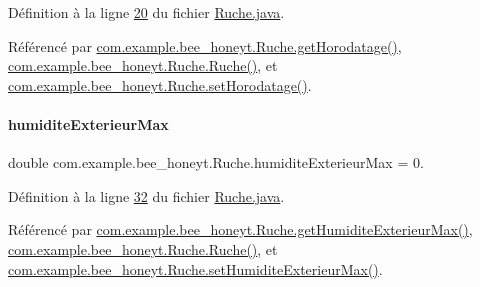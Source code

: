 Définition à la ligne \hyperlink{_ruche_8java_source_l00020}{20} du fichier \hyperlink{_ruche_8java_source}{Ruche.\+java}.



Référencé par \hyperlink{_ruche_8java_source_l00104}{com.\+example.\+bee\+\_\+honeyt.\+Ruche.\+get\+Horodatage()}, \hyperlink{_ruche_8java_source_l00044}{com.\+example.\+bee\+\_\+honeyt.\+Ruche.\+Ruche()}, et \hyperlink{_ruche_8java_source_l00106}{com.\+example.\+bee\+\_\+honeyt.\+Ruche.\+set\+Horodatage()}.

\mbox{\label{classcom_1_1example_1_1bee__honeyt_1_1_ruche_a76e636b4d5e0a18b187905e0d6d73a71}} 
\paragraph{\texorpdfstring{humidite\+Exterieur\+Max}{humiditeExterieurMax}}
{\footnotesize\ttfamily double com.\+example.\+bee\+\_\+honeyt.\+Ruche.\+humidite\+Exterieur\+Max = 0.\hspace{0.3cm}{\ttfamily [private]}}



Définition à la ligne \hyperlink{_ruche_8java_source_l00032}{32} du fichier \hyperlink{_ruche_8java_source}{Ruche.\+java}.



Référencé par \hyperlink{_ruche_8java_source_l00199}{com.\+example.\+bee\+\_\+honeyt.\+Ruche.\+get\+Humidite\+Exterieur\+Max()}, \hyperlink{_ruche_8java_source_l00044}{com.\+example.\+bee\+\_\+honeyt.\+Ruche.\+Ruche()}, et \hyperlink{_ruche_8java_source_l00204}{com.\+example.\+bee\+\_\+honeyt.\+Ruche.\+set\+Humidite\+Exterieur\+Max()}.

\mbox{\label{classcom_1_1example_1_1bee__honeyt_1_1_ruche_ad58b8815412827add256f6c6e11d3043}} 
